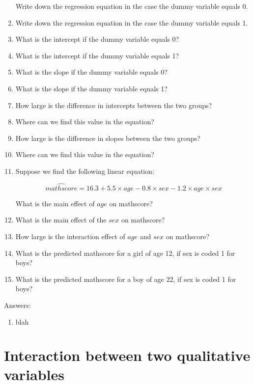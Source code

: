 \documentclass[]{report}\usepackage[]{graphicx}\usepackage[]{color}
\begin{document}
\begin{enumerate}
Write down the regression equation in the case the dummy variable equals 0.
\item Write down the regression equation in the case the dummy variable equals 1.
\item What is the intercept if the dummy variable equals 0?
\item What is the intercept if the dummy variable equals 1?
\item What is the slope if the dummy variable equals 0?
\item What is the slope if the dummy variable equals 1?
\item How large is the difference in intercepts between the two groups? 
\item Where can we find this value in the equation?
\item How large is the difference in slopes between the two groups?\
\item Where can we find this value in the equation?

\item Suppose we find the following linear equation:

\begin{equation} 
\widehat{mathscore} = 16.3 + 5.5  \times age - 0.8  \times sex - 1.2  \times age  \times sex  \nonumber
\end{equation}

What is the main effect of $age$ on mathscore? 
\item What is the main effect of the $sex$ on mathscore?
\item How large is the interaction effect of $age$ and $sex$ on mathscore?
\item What is the predicted mathscore for a girl of age 12, if sex is coded 1 for boys?
\item What is the predicted mathscore for a boy of age 22, if sex is coded 1 for boys?

\end{enumerate}

Answers:
\begin{enumerate}
\item blah
\end{enumerate}






\section{Interaction between two qualitative variables}
\end{document}
